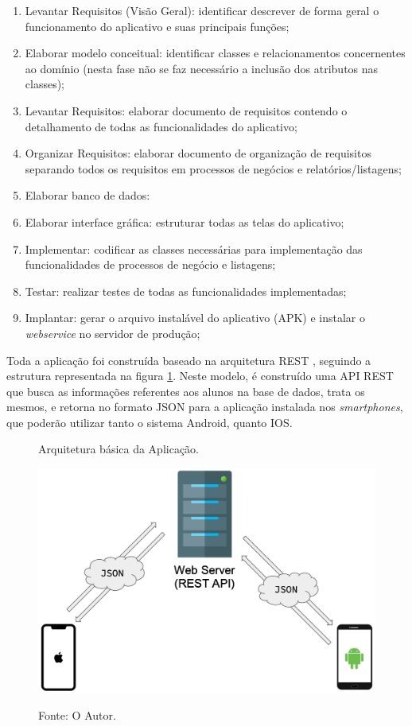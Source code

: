 \begin{enumerate}
   \item Levantar Requisitos (Visão Geral): identificar descrever de forma geral o funcionamento do aplicativo e suas principais funções;
   \item Elaborar modelo conceitual: identificar classes e relacionamentos concernentes ao domínio (nesta fase não se faz necessário a inclusão dos atributos nas classes);
   \item Levantar Requisitos: elaborar documento de requisitos contendo o detalhamento de todas as funcionalidades do aplicativo;
   \item Organizar Requisitos: elaborar documento de organização de requisitos separando todos os requisitos em processos de negócios e relatórios/listagens;
   \item Elaborar banco de dados: 
   \item Elaborar interface gráfica: estruturar todas as telas do aplicativo;
   \item Implementar: codificar as classes necessárias para implementação das funcionalidades de processos de negócio e listagens;
   \item Testar: realizar testes de todas as funcionalidades implementadas;
   \item Implantar: gerar o arquivo instalável do aplicativo (APK) e instalar o \textit{webservice} no servidor de produção;
\end{enumerate}

Toda a aplicação foi construída baseado na arquitetura REST \cite{fielding2000}, seguindo a estrutura representada na figura \ref{figura:arqu_basica}. Neste modelo, é construído uma API REST que busca as informações referentes aos alunos na base de dados, trata os mesmos, e retorna no formato JSON para a aplicação instalada nos \textit{smartphones}, que poderão utilizar tanto o sistema Android, quanto IOS.

\begin{figure}[H]
	\caption{Arquitetura básica da Aplicação.}
	\centering %
	\includegraphics[width=12cm]{resources/esquema_web_service.png} %
	\label{figura:arqu_basica}
	\caption*{Fonte: O Autor.}
\end{figure}

